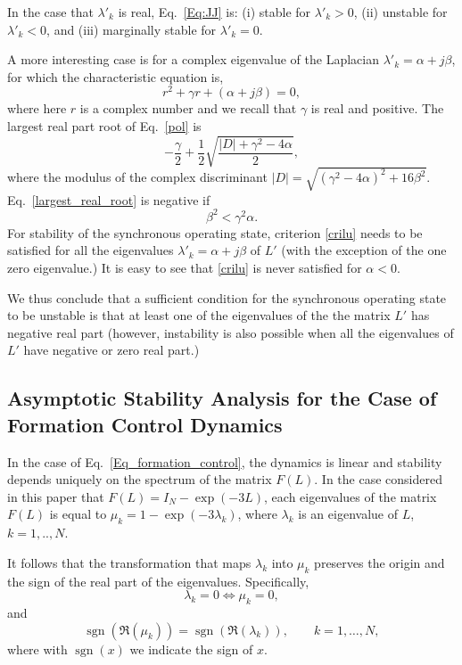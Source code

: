 \documentclass[%
 reprint,
 amsmath,amssymb,
 aip,
]{revtex4-2}
\theoremstyle{italichead}
\theoremstyle{definition}
\begin{document}
{In the case that $\lambda'_k$ is real, Eq.\ \eqref{Eq:JJ} is: (i) stable for $\lambda'_{k}>0$, (ii) unstable for $\lambda'_{k}<0$, and (iii) marginally stable for $\lambda'_{k}=0$. 

A more interesting case is for a complex eigenvalue of the Laplacian $\lambda'_k=\alpha+ j \beta$, for which the characteristic equation is,
\begin{equation} \label{pol}
    r^2+\gamma r +(\alpha+j \beta)=0,
\end{equation}
where here $r$ is a complex number and we recall that $\gamma$ is real and positive. The largest real part root of Eq.\ \eqref{pol} is
\begin{equation} \label{largest_real_root}
    -\frac{\gamma}{2} + \frac{1}{2} \sqrt{\frac{|D|+\gamma^2 - 4 \alpha}{2}},
\end{equation}
where the modulus of the complex discriminant $|D|=\sqrt{(\gamma^2-4 \alpha)^2 + 16 \beta^2}$. Eq.\ \eqref{largest_real_root} is negative if 
\begin{equation} \label{crilu}
\beta^2< \gamma^2 \alpha.
\end{equation}
For stability of the synchronous operating state, criterion \eqref{crilu} needs to be satisfied for all the eigenvalues $\lambda'_k=\alpha+ j \beta$ of $L'$ (with the exception of the one zero eigenvalue.) It is easy to see that \eqref{crilu} is never satisfied for $\alpha<0$. 

We thus conclude that a sufficient condition for the synchronous operating state to be unstable is that at least one of the eigenvalues of the  the matrix $L'$ has negative real part (however, instability is also possible when all the eigenvalues of $L'$ have negative or zero real part.)




\subsection{Asymptotic Stability Analysis for the Case of Formation Control Dynamics \label{Sec:MAIII}}

In the case of Eq.\ \eqref{Eq_formation_control}, the dynamics is linear and stability depends uniquely on the spectrum of the matrix $F(L)$. In the case considered in this paper that $F(L) = I_N - \exp (-3L)$, each eigenvalues of the matrix $F(L)$ is equal to $\mu_k=1- \exp (-3 \lambda_k)$, where $\lambda_k$ is an eigenvalue of $L$, $k=1,..,N$. 

It follows that the transformation that maps $\lambda_k$ into  $\mu_k$ preserves the origin and the sign of the real part of the eigenvalues. Specifically,
\begin{equation}
\lambda_k = 0 \iff \mu_k = 0,
\end{equation}
and
\begin{equation}
\operatorname{sgn}\!\left(\Re(\mu_k)\right)
=
\operatorname{sgn}\!\left(\Re(\lambda_k)\right),
\qquad k = 1,\ldots,N,
\end{equation}
where with $\operatorname{sgn}\!(x)$ we indicate the sign of $x$.

}
\end{document}
